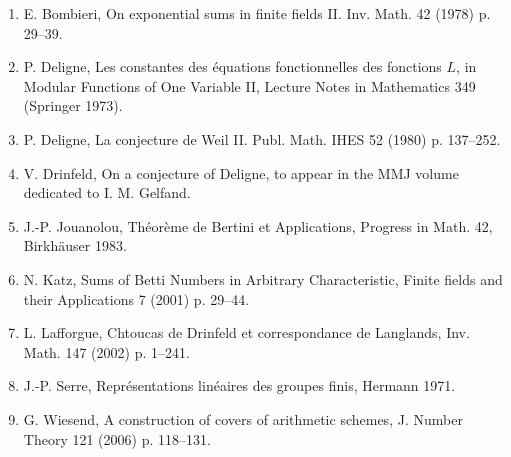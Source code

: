 \documentclass[11pt,a4paper]{article}
\theoremstyle{plain}
\theoremstyle{definition}
\begin{document}
\begin{enumerate}
\item[{[B]}] E. Bombieri, On exponential sums in finite fields II. Inv. Math. 42 (1978) p. 29--39.

\item[{[De1]}] P. Deligne, Les constantes des \'equations fonctionnelles des fonctions $L$, in Modular Functions of One Variable II, Lecture Notes in Mathematics 349 (Springer 1973).

\item[{[De2]}] P. Deligne, La conjecture de Weil II. Publ. Math. IHES 52 (1980) p. 137--252.

\item[{[Dr]}] V. Drinfeld, On a conjecture of Deligne, to appear in the MMJ volume dedicated to I. M. Gelfand.

\item[{[J]}] J.-P. Jouanolou, Th\'eor\`eme de Bertini et Applications, Progress in Math. 42, Birkh\"auser 1983.

\item[{[K]}] N. Katz, Sums of Betti Numbers in Arbitrary Characteristic, Finite fields and their Applications 7 (2001) p. 29--44.

\item[{[L]}] L. Lafforgue, Chtoucas de Drinfeld et correspondance de Langlands, Inv. Math. 147 (2002) p. 1--241.

\item[{[S]}] J.-P. Serre, Repr\'esentations lin\'eaires des groupes finis, Hermann 1971.

\item[{[W]}] G. Wiesend, A construction of covers of arithmetic schemes, J. Number Theory 121 (2006) p. 118--131.
\end{enumerate}
\end{document}

